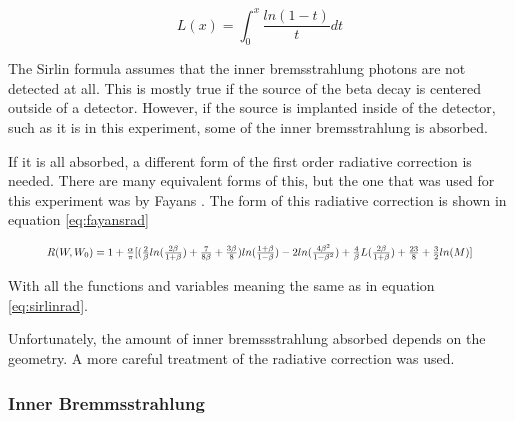 \begin{equation}
	L(x) = \int_{0}^{x} \frac{ln(1 - t)}{t}dt
	\label{eq:spence}
\end{equation}

The Sirlin formula assumes that the inner bremsstrahlung photons are not detected at all.
This is mostly true if the source of the beta decay is centered outside of a detector.
However, if the source is implanted inside of the detector, such as it is in this experiment, some of the inner bremsstrahlung is absorbed.

If it is all absorbed, a different form of the first order radiative correction is needed.
There are many equivalent forms of this, but the one that was used for this experiment was by Fayans \cite{Fay86}.
The form of this radiative correction is shown in equation \ref{eq:fayansrad}

\begin{equation}	
	\resizebox{.9\textwidth}{!}
	{
	$R(W,W_{0}) = 1 + \frac{\alpha}{\pi}[(\frac{2}{\beta}ln(\frac{2\beta}{1+\beta}) + \frac{7}{8\beta} + \frac{3\beta}{8})ln(\frac{1 + \beta}{1 - \beta}) - 2ln(\frac{4\beta^{2}}{1 - \beta^{2}}) + \frac{4}{\beta}L(\frac{2\beta}{1+\beta}) + \frac{23}{8} + \frac{3}{2}ln(M)]$
	}
	\label{eq:fayansrad}
\end{equation}

With all the functions and variables meaning the same as in equation \ref{eq:sirlinrad}.

Unfortunately, the amount of inner bremssstrahlung absorbed depends on the geometry.
A more careful treatment of the radiative correction was used.

\subsubsection{Inner Bremmsstrahlung}

